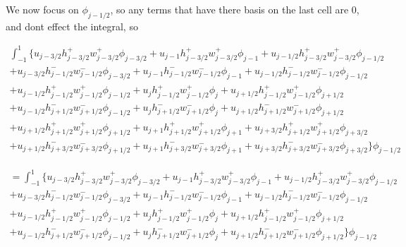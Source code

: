 \documentclass[12pt]{article}
\begin{document}
We now focus on $\phi_{j-1/2} $, so any terms that have there basis on the last cell are 0, and dont effect the integral, so

\begin{multline*}
 \int_{-1}^{1}  \bigg\lbrace u_{j - 3/2} h^+_{j - 3/2}w^+_{j - 3/2} \phi_{j - 3/2} + u_{j - 1} h^+_{j - 3/2}w^+_{j - 3/2}\phi_{j - 1} + u_{j - 1/2} h^+_{j - 3/2}w^+_{j - 3/2}\phi_{j - 1/2}
\\ +u_{j - 3/2}h^-_{j - 1/2}w^-_{j - 1/2}\phi_{j - 3/2} + u_{j - 1}h^-_{j - 1/2}w^-_{j - 1/2}\phi_{j - 1} + u_{j - 1/2}h^-_{j - 1/2}w^-_{j - 1/2}\phi_{j - 1/2} 
\\ +u_{j - 1/2}h^+_{j - 1/2}w^+_{j - 1/2}\phi_{j - 1/2} + u_{j}h^+_{j - 1/2}w^+_{j - 1/2}\phi_{j } + u_{j + 1/2}h^+_{j - 1/2}w^+_{j - 1/2}\phi_{j + 1/2} 
\\ +u_{j - 1/2}h^-_{j + 1/2}w^-_{j + 1/2} \phi_{j - 1/2} + u_{j}h^-_{j + 1/2}w^-_{j + 1/2} \phi_{j } + u_{j + 1/2}h^-_{j + 1/2}w^-_{j + 1/2} \phi_{j + 1/2} 
\\ + u_{j + 1/2}h^+_{j + 1/2}w^+_{j + 1/2}\phi_{j + 1/2} + u_{j + 1}h^+_{j + 1/2}w^+_{j + 1/2}\phi_{j + 1} + u_{j + 3/2}h^+_{j + 1/2}w^+_{j + 1/2}\phi_{j + 3/2} 
\\ +u_{j + 1/2}h^-_{j + 3/2}w^-_{j + 3/2}\phi_{j + 1/2} + u_{j + 1}h^-_{j + 3/2}w^-_{j + 3/2}\phi_{j + 1} + u_{j + 3/2}h^-_{j + 3/2}w^-_{j + 3/2}\phi_{j + 3/2}\bigg\rbrace\phi_{j-1/2}
\end{multline*}

\begin{multline*}
 = \int_{-1}^{1}  \bigg\lbrace u_{j - 3/2} h^+_{j - 3/2}w^+_{j - 3/2} \phi_{j - 3/2} + u_{j - 1} h^+_{j - 3/2}w^+_{j - 3/2}\phi_{j - 1} + u_{j - 1/2} h^+_{j - 3/2}w^+_{j - 3/2}\phi_{j - 1/2}
\\ +u_{j - 3/2}h^-_{j - 1/2}w^-_{j - 1/2}\phi_{j - 3/2} + u_{j - 1}h^-_{j - 1/2}w^-_{j - 1/2}\phi_{j - 1} + u_{j - 1/2}h^-_{j - 1/2}w^-_{j - 1/2}\phi_{j - 1/2} 
\\ +u_{j - 1/2}h^+_{j - 1/2}w^+_{j - 1/2}\phi_{j - 1/2} + u_{j}h^+_{j - 1/2}w^+_{j - 1/2}\phi_{j } + u_{j + 1/2}h^+_{j - 1/2}w^+_{j - 1/2}\phi_{j + 1/2} 
\\ +u_{j - 1/2}h^-_{j + 1/2}w^-_{j + 1/2} \phi_{j - 1/2} + u_{j}h^-_{j + 1/2}w^-_{j + 1/2} \phi_{j } + u_{j + 1/2}h^-_{j + 1/2}w^-_{j + 1/2} \phi_{j + 1/2} 
\bigg\rbrace\phi_{j-1/2}
\end{multline*}
\end{document}
